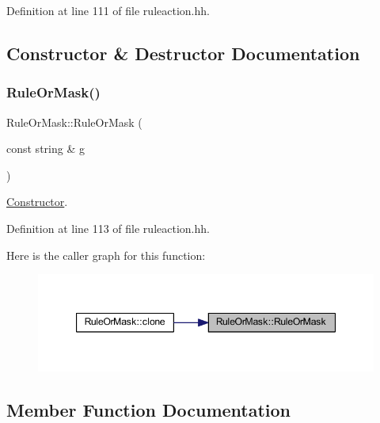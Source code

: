 Definition at line 111 of file ruleaction.\+hh.



\subsection{Constructor \& Destructor Documentation}
\mbox{\label{class_rule_or_mask_ad53b25abac7c7e847417fb431e9f374c}} 
\subsubsection{\texorpdfstring{RuleOrMask()}{RuleOrMask()}}
{\footnotesize\ttfamily Rule\+Or\+Mask\+::\+Rule\+Or\+Mask (\begin{DoxyParamCaption}\item[{const string \&}]{g }\end{DoxyParamCaption})\hspace{0.3cm}{\ttfamily [inline]}}



\mbox{\hyperlink{class_constructor}{Constructor}}. 



Definition at line 113 of file ruleaction.\+hh.

Here is the caller graph for this function\+:
\nopagebreak
\begin{figure}[H]
\begin{center}
\leavevmode
\includegraphics[width=347pt]{class_rule_or_mask_ad53b25abac7c7e847417fb431e9f374c_icgraph}
\end{center}
\end{figure}


\subsection{Member Function Documentation}
\mbox{\label{class_rule_or_mask_ab0e9a7d945a09be5c298cd08937ab6a7}} 
